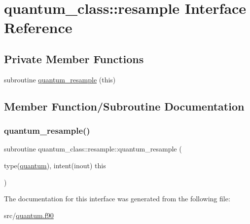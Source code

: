 \hypertarget{interfacequantum__class_1_1resample}{}\section{quantum\+\_\+class\+:\+:resample Interface Reference}
\label{interfacequantum__class_1_1resample}
\subsection*{Private Member Functions}
\begin{DoxyCompactItemize}
\item 
subroutine \hyperlink{interfacequantum__class_1_1resample_a9a1c6be2f660fad436c6ff55fa7dbd11}{quantum\+\_\+resample} (this)
\end{DoxyCompactItemize}


\subsection{Member Function/\+Subroutine Documentation}
\mbox{\label{interfacequantum__class_1_1resample_a9a1c6be2f660fad436c6ff55fa7dbd11}} 
\subsubsection{\texorpdfstring{quantum\+\_\+resample()}{quantum\_resample()}}
{\footnotesize\ttfamily subroutine quantum\+\_\+class\+::resample\+::quantum\+\_\+resample (\begin{DoxyParamCaption}\item[{type(\hyperlink{structquantum__class_1_1quantum}{quantum}), intent(inout)}]{this }\end{DoxyParamCaption})\hspace{0.3cm}{\ttfamily [private]}}



The documentation for this interface was generated from the following file\+:\begin{DoxyCompactItemize}
\item 
src/\hyperlink{quantum_8f90}{quantum.\+f90}\end{DoxyCompactItemize}
